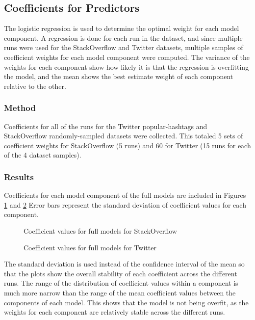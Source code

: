 \documentclass[man,floatsintext,donotrepeattitle]{apa6}
\begin{document}
\subsection{Coefficients for Predictors}

The logistic regression is used to determine the optimal weight for each model component.
A regression is done for each run in the dataset, and since multiple runs were used for the StackOverflow and Twitter datasets, multiple samples of coefficient weights for each model component were computed.
The variance of the weights for each component show how likely it is that the regression is overfitting the model,
and the mean shows the best estimate weight of each component relative to the other.

\subsubsection{Method}

Coefficients for all of the runs for the Twitter popular-hashtags and StackOverflow randomly-sampled datasets were collected.
This totaled 5 sets of coefficient weights for StackOverflow (5 runs) and 60 for Twitter (15 runs for each of the 4 dataset samples).

\subsubsection{Results}

Coefficients for each model component of the full models are included in Figures \ref{figContextCoeffSO} and \ref{figContextCoeffT}
Error bars represent the standard deviation of coefficient values for each component.

\begin{figure}[!htbp]
  \caption{Coefficient values for full models for StackOverflow}
  \label{figContextCoeffSO}
\end{figure}

\begin{figure}[!htbp]
  \caption{Coefficient values for full models for Twitter}
  \label{figContextCoeffT}
\end{figure}

The standard deviation is used instead of the confidence interval of the mean so that the plots show the overall stability of each coefficient across the different runs.
The range of the distribution of coefficient values within a component is much more narrow than the range of the mean coefficient values between the components of each model.
This shows that the model is not being overfit, as the weights for each component are relatively stable across the different runs.
\end{document}
